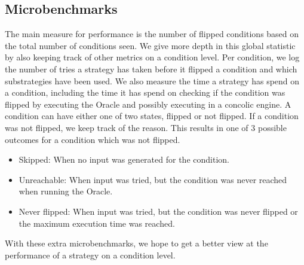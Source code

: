 \subsection{Microbenchmarks}\label{subsec:performanceMetrics}
The main measure for performance is the number of flipped conditions based on the total number of conditions seen. We give more depth in this global statistic by also keeping track of other metrics on a condition level. Per condition, we log the number of tries a strategy has taken before it flipped a condition and which substrategies have been used.
We also measure the time a strategy has spend on a condition, including the time it has spend on checking if the condition was flipped by executing the Oracle and possibly executing in a concolic engine.
A condition can have either one of two states, flipped or not flipped. If a condition was not flipped, we keep track of the reason. This results in one of 3 possible outcomes for a condition which was not flipped.
\begin{itemize}
    \item Skipped: When no input was generated for the condition.
    \item Unreachable: When input was tried, but the condition was never reached when running the Oracle.
    \item Never flipped: When input was tried, but the condition was never flipped or the maximum execution time was reached.
\end{itemize}
With these extra microbenchmarks, we hope to get a better view at the performance of a strategy on a condition level.

